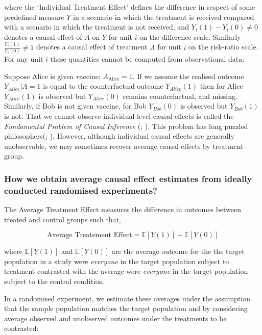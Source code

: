 \documentclass[
  single column]{article}
\begin{document}
where the `Individual Treatment Effect' defines the difference in
respect of some predefined measure \(Y\) in a scenario in which the
treatment is received compared with a scenario in which the treatment is
not received, and \(Y_i(1) - Y_i(0) \neq 0\) denotes a causal effect of
\(A\) on \(Y\) for unit \(i\) on the difference scale. Similarly
\(\frac{Y_i(1)}{Y_i(0)}\neq 1\) denotes a causal effect of treatment
\(A\) for unit \(i\) on the risk-ratio scale. For any unit \(i\) these
quantities cannot be computed from observational data.

Suppose Alice is given vaccine: \(A_{\text{Alice}} = 1\). If we assume
the realised outcome \(Y_{Alice}| A = 1\) is equal to the counterfactual
outcome \(Y_{Alice}(1)\) then for Alice \(Y_{Alice}(1)\) is observed but
\(Y_{Alice}(0)\) remains counterfactual, and missing. Similarly, if Bob
is not given vaccine, for Bob \(Y_{Bob}(0)\) is observed but
\(Y_{Bob}(1)\) is not. That we cannot observe individual level causal
effects is called the \emph{Fundamental Problem of Causal Inference}
(;
). This problem has long puzzled
philosophers(;
), However, although individual
causal effects are generally unobservable, we may sometimes recover
average causal effects by treatment group.

\subsubsection{How we obtain average causal effect estimates from
ideally conducted randomised
experiments?}\label{how-we-obtain-average-causal-effect-estimates-from-ideally-conducted-randomised-experiments}

The Average Treatment Effect measures the difference in outcomes between
treated and control groups such that,

\[
\text{Average Treatement Effect} = \mathbb{E}[Y(1)] - \mathbb{E}[Y(0)]
\]

where \(\mathbb{E}[Y(1)]\) and \(\mathbb{E}[Y(0)]\) are the average
outcome for the the target population in a study were \emph{everyone} in
the target population subject to treatment contrasted with the average
were \emph{everyone} in the target population subject to the control
condition.

In a randomised experiment, we estimate these averages under the
assumption that the sample population matches the target population and
by considering average observed and unobserved outcomes under the
treatments to be contrasted:
\end{document}
